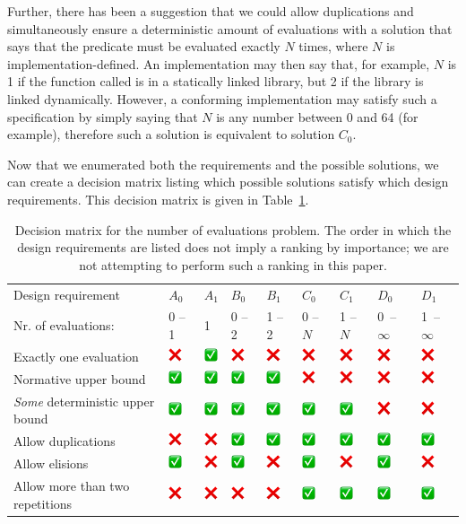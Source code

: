 Further, there has been a suggestion that we could allow duplications and simultaneously ensure a deterministic amount of evaluations with a solution that says that the predicate must be evaluated exactly $N$ times, where $N$ is implementation-defined. An implementation may then say that, for example, $N$ is 1 if the function called is in a statically linked library, but 2 if the library is linked dynamically. However, a conforming implementation may satisfy such a specification by simply saying that $N$ is any number between 0 and 64 (for example), therefore such a solution is equivalent to solution $C_0$.

Now that we enumerated both the requirements and the possible solutions, we can create a decision matrix listing which possible solutions satisfy which design requirements. This decision matrix is given in Table~\ref{table:matrix}.

\newcommand{\yes}{\includegraphics[width=4mm]{images/yes.png}}
\newcommand{\no}{\includegraphics[width=4mm]{images/no.png}}
\vspace{4mm}
\begin{table}[!htbp]
\begin{tabular}{|p{5.4cm}|p{0.9cm}|p{0.9cm}|p{0.9cm}|p{0.9cm}|p{0.9cm}|p{0.9cm}|p{0.9cm}|p{0.9cm}|}
\hline 
Design requirement & $A_0$ & $A_1$ & $B_0$ & $B_1$ & $C_0$ & $C_1$ & $D_0$ & $D_1$ \\
\phantom{xxxxxxxxxxxi}Nr. of evaluations:& 0 -- 1 & 1 & 0 -- 2& 1 -- 2 & 0 -- $N$ & 1 -- $N$ & \mbox{0 -- $\infty$} & \mbox{1 -- $\infty$} \\
\hline
Exactly one evaluation& \no & \yes & \no & \no & \no & \no & \no & \no \\
\hline
Normative upper bound & \yes & \yes & \yes & \yes & \no & \no & \no & \no \\
\hline
\emph{Some} deterministic upper bound & \yes & \yes & \yes & \yes & \yes & \yes & \no & \no \\
\hline
Allow duplications & \no & \no & \yes & \yes  & \yes & \yes & \yes & \yes \\
\hline
Allow elisions & \yes & \no & \yes & \no & \yes & \no & \yes & \no \\
\hline
Allow more than two repetitions& \no & \no & \no & \no & \yes & \yes & \yes & \yes \\
\hline
\end{tabular}
\vspace{2mm}
\caption{Decision matrix for the number of evaluations problem. The order in which the design requirements are listed does not imply a ranking by importance; we are not attempting to perform such a ranking in this paper.}
  \label{table:matrix}
\end{table}


